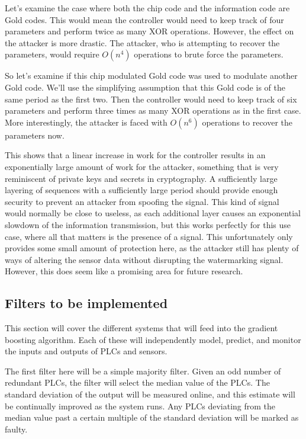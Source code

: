 \documentclass[10pt,twocolumn]{IEEEtran}
\begin{document}
Let's examine the case where both the chip code and the information code are Gold codes.
This would mean the controller would need to keep track of four parameters and perform twice as many XOR operations.
However, the effect on the attacker is more drastic.
The attacker, who is attempting to recover the parameters, would require $O(n^4)$ operations to brute force the parameters.

So let's examine if this chip modulated Gold code was used to modulate another Gold code.
We'll use the simplifying assumption that this Gold code is of the same period as the first two.
Then the controller would need to keep track of six parameters and perform three times as many XOR operations as in the first case.
More interestingly, the attacker is faced with $O(n^6)$ operations to recover the parameters now.

This shows that a linear increase in work for the controller results in an exponentially large amount of work for the attacker, something that is very reminiscent of private keys and secrets in cryptography.
A sufficiently large layering of sequences with a sufficiently large period should provide enough security to prevent an attacker from spoofing the signal.
This kind of signal would normally be close to useless, as each additional layer causes an exponential slowdown of the information transmission, but this works perfectly for this use case, where all that matters is the presence of a signal.
This unfortunately only provides some small amount of protection here, as the attacker still has plenty of ways of altering the sensor data without disrupting the watermarking signal.
However, this does seem like a promising area for future research.

\subsection{Filters to be implemented}
This section will cover the different systems that will feed into the gradient boosting algorithm.
Each of these will independently model, predict, and monitor the inputs and outputs of PLCs and sensors.

The first filter here will be a simple majority filter.
Given an odd number of redundant PLCs, the filter will select the median value of the PLCs.
The standard deviation of the output will be measured online, and this estimate will be continually improved as the system runs.
Any PLCs deviating from the median value past a certain multiple of the standard deviation will be marked as faulty.
\end{document}
